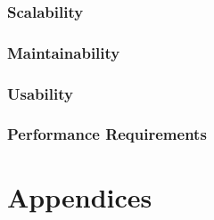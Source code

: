 \documentclass[12pt]{article}
\begin{document}
                  	\subsubsection{Scalability}
                  	
                  	\subsubsection{Maintainability}
                  	
                  	\subsubsection{Usability}
                  	
                  	\subsubsection{Performance Requirements}
                
                \section{Appendices}
        
                
                        
        
        
\end{document}

